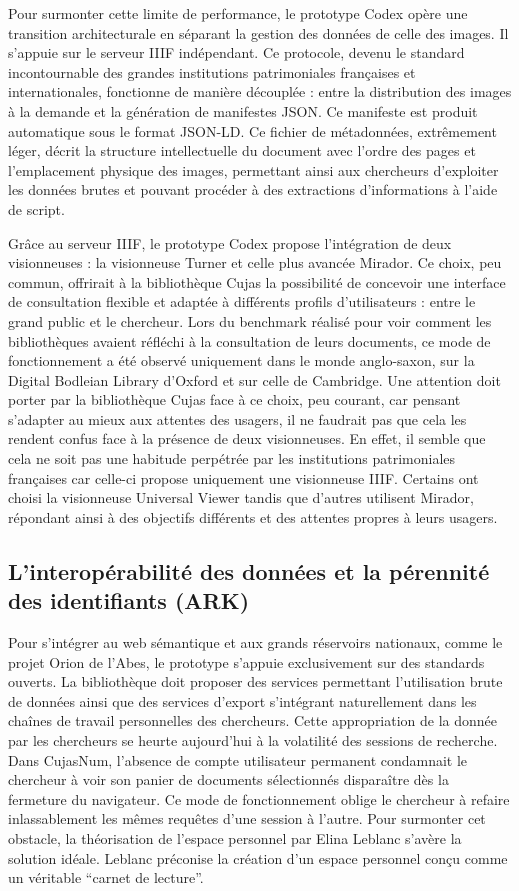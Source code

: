 Pour surmonter cette limite de performance, le prototype Codex opère une transition architecturale en séparant la gestion des données de celle des images. Il s'appuie sur le serveur IIIF indépendant. Ce protocole, devenu le standard incontournable des grandes institutions patrimoniales françaises et internationales, fonctionne de manière découplée : entre la distribution des images à la demande et la génération de manifestes JSON. Ce manifeste est produit automatique sous le format JSON-LD. Ce fichier de métadonnées, extrêmement léger, décrit la structure intellectuelle du document avec l'ordre des pages et l'emplacement physique des images, permettant ainsi aux chercheurs d'exploiter les données brutes et pouvant procéder à des extractions d'informations à l'aide de script.

Grâce au serveur IIIF, le prototype Codex propose l'intégration de deux visionneuses : la visionneuse Turner et celle plus avancée Mirador. Ce choix, peu commun, offrirait à la bibliothèque Cujas la possibilité de concevoir une interface de consultation flexible et adaptée à différents profils d'utilisateurs : entre le grand public et le chercheur. Lors du benchmark réalisé pour voir comment les bibliothèques avaient réfléchi à la consultation de leurs documents, ce mode de fonctionnement a été observé uniquement dans le monde anglo-saxon, sur la Digital Bodleian Library d'Oxford et sur celle de Cambridge. Une attention doit porter par la bibliothèque Cujas face à ce choix, peu courant, car pensant s'adapter au mieux aux attentes des usagers, il ne faudrait pas que cela les rendent confus face à la présence de deux visionneuses. En effet, il semble que cela ne soit pas une habitude perpétrée par les institutions patrimoniales françaises car celle-ci propose uniquement une visionneuse IIIF. Certains ont choisi la visionneuse Universal Viewer tandis que d'autres utilisent Mirador, répondant ainsi à des objectifs différents et des attentes propres à leurs usagers.

\subsection{L'interopérabilité des données et la pérennité des identifiants (ARK)}
Pour s'intégrer au web sémantique et aux grands réservoirs nationaux, comme le projet Orion de l'Abes, le prototype s'appuie exclusivement sur des standards ouverts. La bibliothèque doit proposer des services permettant l'utilisation brute de données ainsi que des services d'export s'intégrant naturellement dans les chaînes de travail personnelles des chercheurs. Cette appropriation de la donnée par les chercheurs se heurte aujourd'hui à la volatilité des sessions de recherche. Dans CujasNum, l'absence de compte utilisateur permanent condamnait le chercheur à voir son panier de documents sélectionnés disparaître dès la fermeture du navigateur. Ce mode de fonctionnement oblige le chercheur à refaire inlassablement les mêmes requêtes d'une session à l'autre. Pour surmonter cet obstacle, la théorisation de l'espace personnel par Elina Leblanc s'avère la solution idéale. Leblanc préconise la création d'un espace personnel conçu comme un véritable \enquote{carnet de lecture}. 

